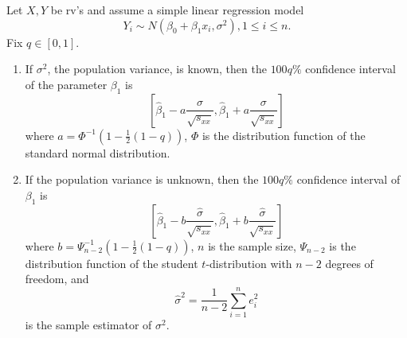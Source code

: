 \documentclass[11pt,fleqn]{book} %
\begin{document}
\begin{proposition} \label{prop:1122}
Let \(X, Y\) be rv's and assume a simple linear regression model
\[
Y_i \sim N(\beta_0 + \beta_1x_i, \sigma^2), 1\leq i \leq n.
\]
\indent Fix \(q \in [0, 1]\).
\begin{enumerate}
\item If \(\sigma^2\), the population variance, is known, then the \(100q\%\) confidence interval of the parameter \(\beta_1\) is
\[
\left[\hat{\beta}_1 - a\frac{\sigma}{\sqrt{s_{xx}}}, \hat{\beta}_1 + a\frac{\sigma}{\sqrt{s_{xx}}}\right]
\]
where \(a = \Phi^{-1}\left(1 - \frac12(1 - q)\right)\), \(\Phi\) is the distribution function of the standard normal distribution.
\item If the population variance is unknown, then the \(100q\%\) confidence interval of \(\beta_1\) is
\[
\left[\hat{\beta}_1 - b\frac{\hat{\sigma}}{\sqrt{s_{xx}}}, \hat{\beta}_1 + b\frac{\hat{\sigma}}{\sqrt{s_{xx}}}\right]
\]
where \(b = \Psi_{n - 2}^{-1}\left(1 - \frac12(1 - q)\right)\), \(n\) is the sample size, \(\Psi_{n-2}\) is the distribution function of the student \(t\)-distribution with \(n - 2\) degrees of freedom, and 
\[
\hat{\sigma}^2 = \frac{1}{n - 2}\sum_{i=1}^ne_i^2
\]
is the sample estimator of \(\sigma^2\).
\end{enumerate}
\end{proposition}
\end{document}
